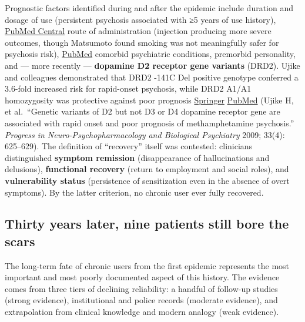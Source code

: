 Prognostic factors identified during and after the epidemic include duration and dosage of use (persistent psychosis associated with ≥5 years of use history), \href{https://pmc.ncbi.nlm.nih.gov/articles/PMC5027896/}{PubMed Central} route of administration (injection producing more severe outcomes, though Matsumoto found smoking was not meaningfully safer for psychosis risk), \href{https://pubmed.ncbi.nlm.nih.gov/12133119/}{PubMed} comorbid psychiatric conditions, premorbid personality, and --- more recently --- \textbf{dopamine D2 receptor gene variants} (DRD2). Ujike and colleagues demonstrated that DRD2 -141C Del positive genotype conferred a 3.6-fold increased risk for rapid-onset psychosis, while DRD2 A1/A1 homozygosity was protective against poor prognosis \href{https://link.springer.com/chapter/10.1007/978-94-007-0837-2_15}{Springer} \href{https://pubmed.ncbi.nlm.nih.gov/19275926/?dopt=Abstract}{PubMed} (Ujike H, et al.~``Genetic variants of D2 but not D3 or D4 dopamine receptor gene are associated with rapid onset and poor prognosis of methamphetamine psychosis.'' \emph{Progress in Neuro-Psychopharmacology and Biological Psychiatry} 2009; 33(4): 625--629). The definition of ``recovery'' itself was contested: clinicians distinguished \textbf{symptom remission} (disappearance of hallucinations and delusions), \textbf{functional recovery} (return to employment and social roles), and \textbf{vulnerability status} (persistence of sensitization even in the absence of overt symptoms). By the latter criterion, no chronic user ever fully recovered.

\subsection{Thirty years later, nine patients still bore the scars}\label{12_philopon-thirty-years-later-nine-patients-still-bore-the-scars}

The long-term fate of chronic users from the first epidemic represents the most important and most poorly documented aspect of this history. The evidence comes from three tiers of declining reliability: a handful of follow-up studies (strong evidence), institutional and police records (moderate evidence), and extrapolation from clinical knowledge and modern analogy (weak evidence).

